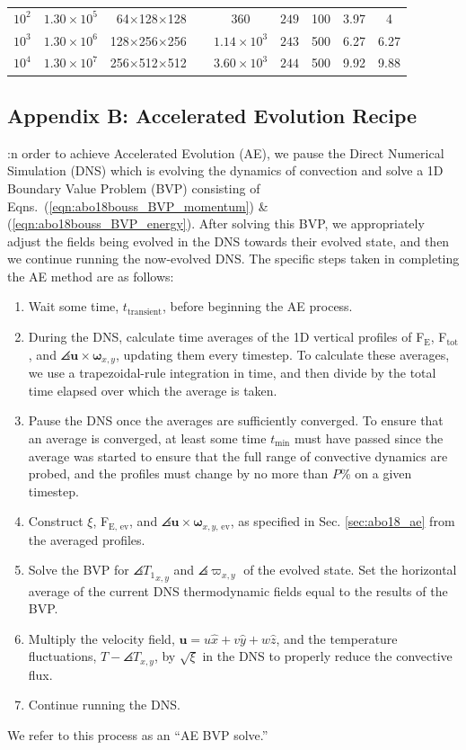 \begin{table}
\begin{center}
\begin{tabular}{ c c r | c c c  | c c  }
$10^2$          &	$1.30 \times 10^5$	&	64$\times$128$\times$128$\,\,\,\,\,\,\,$   &	$360$	&	$249$	&	100	&	3.97	&	4	\\
$10^3$          &	$1.30 \times 10^6$	&	128$\times$256$\times$256$\,\,\,\,\,\,\,$	&	$1.14 \times 10^3$	&	$243$	&	500	&	6.27	&	6.27	\\
$10^4$          &	$1.30 \times 10^7$	&	256$\times$512$\times$512$\,\,\,\,\,\,\,$	&	$3.60 \times 10^3$	&	$244$	&	500	&	9.92	&	9.88	\\
\hline																	
\end{tabular}
\end{center}
\end{table}


\subsection{Appendix B: Accelerated Evolution Recipe}
\label{appendix:recipe}
:n order to achieve Accelerated Evolution (AE), we pause the Direct Numerical Simulation (DNS) which is evolving the dynamics of convection and solve a 1D Boundary Value Problem (BVP) consisting of Eqns.~(\ref{eqn:abo18bouss_BVP_momentum}) \& (\ref{eqn:abo18bouss_BVP_energy}).
After solving this BVP, we appropriately adjust the fields being evolved in the DNS towards their evolved state, and then we continue running the now-evolved DNS.
The specific steps taken in completing the AE method are as follows:
\begin{enumerate}
	\item Wait some time, $t_{\text{transient}}$, before beginning the AE process.
	\item During the DNS, calculate time averages of the 1D vertical profiles of
	F$_{\text{E}}$, F$_{\text{tot}}$, and $\angles{\bm{u} \times \bm{\omega}}_{x,y}$, updating them every timestep.  
	To calculate these averages, we use a trapezoidal-rule integration in time, and then divide by the total time elapsed over which the average is taken. 
	\item Pause the DNS once the averages are sufficiently converged. 
	To ensure that an average is converged, at least some time $t_{\text{min}}$ must have passed since the average was started to ensure that the full range of convective dynamics are probed, and the profiles must change by no more than $P$\% on a given timestep.
	\item Construct $\xi$, F$_{\text{E, ev}}$, and $\angles{\bm{u} \times \bm{\omega}}_{x,y\text{, ev}}$, as specified in Sec. \ref{sec:abo18_ae} from the averaged profiles.
	\item Solve the BVP for $\angles{T_1}_{x,y}$ and $\angles{\varpi}_{x,y}$ of the evolved state.  
	Set the horizontal average of the current DNS thermodynamic fields equal to the results of the BVP.
	\item Multiply the velocity field, $\bm{u} = u\hat{x} + v\hat{y} + w\hat{z}$, and the temperature fluctuations, $T - \angles{T}_{x,y}$, by $\sqrt{\xi}$ in the DNS to properly reduce the convective flux.
	\item Continue running the DNS.
\end{enumerate}
We refer to this process as an ``AE BVP solve.''

